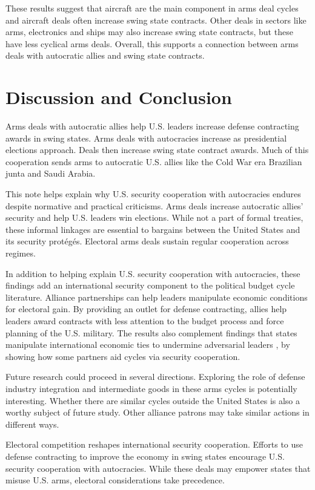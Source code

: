 \documentclass[12pt]{article}
\begin{document}
These results suggest that aircraft are the main component in arms deal cycles and aircraft deals often increase swing state contracts. 
Other deals in sectors like arms, electronics and ships may also increase swing state contracts, but these have less cyclical arms deals. 
Overall, this supports a connection between arms deals with autocratic allies and swing state contracts.  



\section{Discussion and Conclusion}


Arms deals with autocratic allies help U.S. leaders increase defense contracting awards in swing states. 
Arms deals with autocracies increase as presidential elections approach.
Deals then increase swing state contract awards. 
Much of this cooperation sends arms to autocratic U.S. allies like the Cold War era Brazilian junta and Saudi Arabia.


This note helps explain why U.S. security cooperation with autocracies endures despite normative and practical criticisms. 
Arms deals increase autocratic allies' security and help U.S. leaders win elections.
While not a part of formal treaties, these informal linkages are essential to bargains between the United States and its security prot{\'e}g{\'e}s.
Electoral arms deals sustain regular cooperation across regimes.


In addition to helping explain U.S. security cooperation with autocracies, these findings add an international security component to the political budget cycle literature.
Alliance partnerships can help leaders manipulate economic conditions for electoral gain. 
By providing an outlet for defense contracting, allies help leaders award contracts with less attention to the budget process and force planning of the U.S. military.
The results also complement findings that states manipulate international economic ties to undermine adversarial leaders \citep{ChyzhUrbatsch2021, KimMargalit2021}, by showing how some partners aid cycles via security cooperation. 



Future research could proceed in several directions. 
Exploring the role of defense industry integration and intermediate goods in these arms cycles is potentially interesting.
Whether there are similar cycles outside the United States is also a worthy subject of future study. 
Other alliance patrons may take similar actions in different ways.


Electoral competition reshapes international security cooperation.
Efforts to use defense contracting to improve the economy in swing states encourage U.S. security cooperation with autocracies.
While these deals may empower states that misuse U.S. arms, electoral considerations take precedence. 


\newpage
\singlespace
 
 
\end{document}
